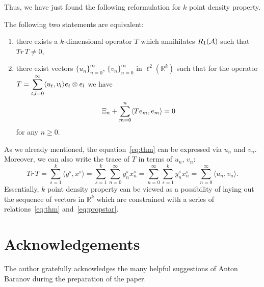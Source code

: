 \documentclass[12pt]{amsart}
\theoremstyle{case}
\begin{document}
  Thus, we have just found the following reformulation for $k$ point density property.
  \begin{prop}
    \label{prop:kreformulation}
    The following two statements are equivalent:
    \begin{enumerate}
      \item there exists a $k$-dimensional operator $T$ which annihilates $R_1(\cal{A})$
        such that $Tr\, T \neq 0$,
      \item there exist vectors $\{u_n\}_{n=0}^\infty$, $\{v_n\}_{n=0}^\infty$ in $\ell^2(\mathbb{R}^k)$ such that
        for the operator $T = \displaystyle\sum_{t,l=0}^\infty \inner{u_t}{v_l} e_t \otimes e_l$ we have
        \begin{equation}
          \label{eq:thm}
          \Xi_n + \sum_{m=0}^n \inner{Te_m}{e_m} = 0
        \end{equation}
          for any $n \geq 0$.
    \end{enumerate}
  \end{prop}
  As we already mentioned, the equation~\eqref{eq:thm} can be expressed via $u_n$ and $v_n$.
  Moreover, we can also write the trace of $T$ in terms of $u_n$, $v_n$:
    \begin{equation}
      \label{eq:propstar}
        Tr\,T = \sum_{s=1}^k \langle y^s, x^s \rangle = \sum_{s=1}^k \sum_{n=0}^\infty y^s_n x^s_n
              = \sum_{n=0}^\infty \sum_{s=1}^k y^s_n x^s_n = \sum_{n=0}^\infty \langle u_n, v_n \rangle.
    \end{equation}
  Essentially, $k$ point density property can be viewed as a
    possibility of laying out the sequence of vectors in $\mathbb{R}^k$ which are constrained with
    a series of relations~\eqref{eq:thm} and~\eqref{eq:propstar}.


\bigskip

\section{Acknowledgements}
  The author gratefully acknowledges the many helpful suggestions of Anton Baranov during the preparation of the paper.


\end{document}
